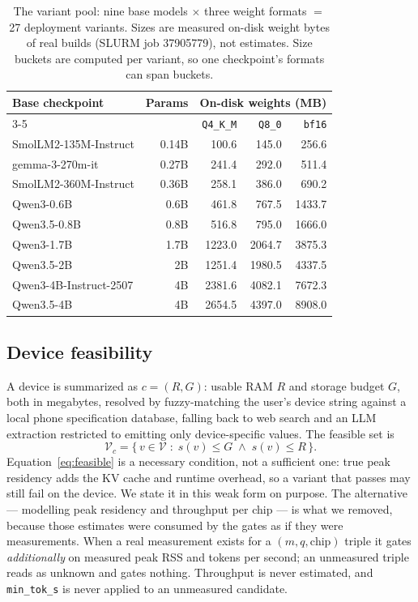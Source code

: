 \documentclass[sigconf,10pt]{acmart}
\begin{document}
\begin{table}[t]
\centering
\small
\caption{The variant pool: nine base models $\times$ three weight formats $=$ 27 deployment
variants. Sizes are measured on-disk weight bytes of real builds (SLURM job 37905779), not
estimates. Size buckets are computed per variant, so one checkpoint's formats can span
buckets.}
\label{tab:pool}
\begin{tabular}{@{}lrrrr@{}}
\toprule
Base checkpoint & Params & \multicolumn{3}{c}{On-disk weights (MB)} \\
\cmidrule(l){3-5}
 & & \texttt{Q4\_K\_M} & \texttt{Q8\_0} & \texttt{bf16} \\
\midrule
SmolLM2-135M-Instruct        & 0.14B & 100.6  & 145.0  & 256.6  \\
gemma-3-270m-it              & 0.27B & 241.4  & 292.0  & 511.4  \\
SmolLM2-360M-Instruct        & 0.36B & 258.1  & 386.0  & 690.2  \\
Qwen3-0.6B                   & 0.6B  & 461.8  & 767.5  & 1433.7 \\
Qwen3.5-0.8B                 & 0.8B  & 516.8  & 795.0  & 1666.0 \\
Qwen3-1.7B                   & 1.7B  & 1223.0 & 2064.7 & 3875.3 \\
Qwen3.5-2B                   & 2B    & 1251.4 & 1980.5 & 4337.5 \\
Qwen3-4B-Instruct-2507       & 4B    & 2381.6 & 4082.1 & 7672.3 \\
Qwen3.5-4B                   & 4B    & 2654.5 & 4397.0 & 8908.0 \\
\bottomrule
\end{tabular}
\end{table}

\subsection{Device feasibility}

A device is summarized as $c = (R, G)$: usable RAM $R$ and storage budget $G$, both in
megabytes, resolved by fuzzy-matching the user's device string against a local phone
specification database, falling back to web search and an LLM extraction restricted to
emitting only device-specific values. The feasible set is
\begin{equation}
\mathcal{V}_c = \{\, v \in \mathcal{V} \;:\; s(v) \le G \;\wedge\; s(v) \le R \,\}.
\label{eq:feasible}
\end{equation}
Equation~\ref{eq:feasible} is a necessary condition, not a sufficient one: true peak
residency adds the KV cache and runtime overhead, so a variant that passes may still fail on
the device. We state it in this weak form on purpose. The alternative --- modelling peak
residency and throughput per chip --- is what we removed, because those estimates were
consumed by the gates as if they were measurements. When a real measurement exists for a
$(m,q,\text{chip})$ triple it gates \emph{additionally} on measured peak RSS and tokens per
second; an unmeasured triple reads as unknown and gates nothing. Throughput is never
estimated, and \texttt{min\_tok\_s} is never applied to an unmeasured candidate.
\end{document}
